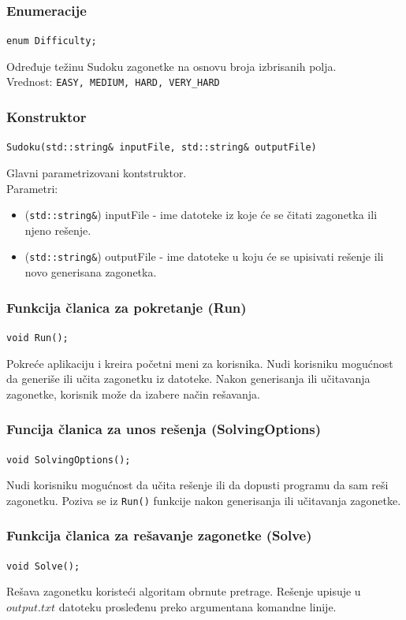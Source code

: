 \documentclass[a4paper]{article}
\begin{document}
    \subsubsection{Enumeracije}
    \texttt{enum Difficulty;}
    \par Određuje težinu Sudoku zagonetke na osnovu broja izbrisanih polja. \\ 
    Vrednost: \texttt{EASY, MEDIUM, HARD, VERY\_HARD}

    \subsubsection{Konstruktor}
    \texttt{Sudoku(std::string\& inputFile, std::string\& outputFile)}
    \par Glavni parametrizovani kontstruktor.\\
    Parametri:
    \begin{itemize}
        \item (\texttt{std::string\&}) inputFile - ime datoteke iz koje će se čitati zagonetka ili njeno rešenje.
        \item (\texttt{std::string\&}) outputFile - ime datoteke u koju će se upisivati rešenje ili novo generisana zagonetka.
    \end{itemize}

    \subsubsection{Funkcija članica za pokretanje (Run)}
    \texttt{void Run();}
    \par Pokreće aplikaciju i kreira početni meni za korisnika. Nudi korisniku mogu\-ćnost da generiše 
    ili učita zagonetku iz datoteke. Nakon generisanja ili učitavanja zagonetke, korisnik može da izabere način rešavanja.

    \subsubsection{Funcija članica za unos rešenja (SolvingOptions)}
    \texttt{void SolvingOptions();}
    \par Nudi korisniku mogućnost da učita rešenje ili da dopusti programu da sam reši zagonetku. Poziva se  iz \texttt{Run()} funkcije nakon generisanja 
    ili učitavanja zagonetke.

    \subsubsection{Funkcija članica za rešavanje zagonetke (Solve)}
    \texttt{void Solve();}
    \par Rešava zagonetku koristeći algoritam obrnute pretrage. Rešenje upisuje u $output.txt$ datoteku prosleđenu preko argumentana komandne linije.
\end{document}

